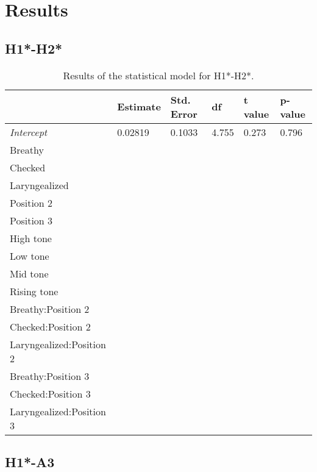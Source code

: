 \documentclass[12pt, letterpaper]{article}
\providecommand{\lsptoprule}{\midrule\toprule}
\providecommand{\lspbottomrule}{\bottomrule\midrule}
\begin{document}
\section{Results} \label{sec:Results}

\subsection{H1*-H2*} \label{sec:H1H2}

\begin{table}[!h]
  \centering
  \caption{Results of the statistical model for H1*-H2*.}
  \label{tab:H1H2Results}
  \begin{tabular}{llllll}
    \lsptoprule
     & Estimate & Std. Error & df & t value & p-value \\ \hline
    \textit{Intercept} & 0.02819 & 0.1033 & 4.755 & 0.273 & 0.796 \\
    Breathy &&&&& \\
    Checked &&&&& \\
    Laryngealized &&&&& \\
    Position 2 &&&&& \\
    Position 3 &&&&& \\
    High tone &&&&& \\
    Low tone &&&&& \\
    Mid tone &&&&& \\
    Rising tone &&&&& \\
    Breathy:Position 2 &&&&& \\
    Checked:Position 2 &&&&& \\
    Laryngealized:Position 2 &&&&& \\
    Breathy:Position 3 &&&&& \\
    Checked:Position 3 &&&&& \\
    Laryngealized:Position 3 &&&&& \\
    \lspbottomrule
  \end{tabular}
\end{table}

\subsection{H1*-A3} \label{sec:H1A3}
\end{document}
